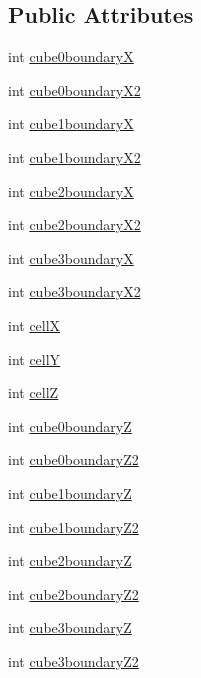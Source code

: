 \subsection*{Public Attributes}
\begin{DoxyCompactItemize}
\item 
int \hyperlink{classl_shape_a010d0a5f7112c92ba28d1ae461af5bf4}{cube0boundary\-X}
\item 
int \hyperlink{classl_shape_a4af09e60d1ee2408c5ff33ada6d6c7ae}{cube0boundary\-X2}
\item 
int \hyperlink{classl_shape_ad55fd69b555360ad332e15c30e4d496a}{cube1boundary\-X}
\item 
int \hyperlink{classl_shape_a89bc6ad05e9a45db52341c5ef745b020}{cube1boundary\-X2}
\item 
int \hyperlink{classl_shape_aebf8ca792e9ee7de8c5b4674f93f3123}{cube2boundary\-X}
\item 
int \hyperlink{classl_shape_ae6dbc4f9550014728716311d769263a2}{cube2boundary\-X2}
\item 
int \hyperlink{classl_shape_a605675f9717c3278a5d75e1b5e8eaf68}{cube3boundary\-X}
\item 
int \hyperlink{classl_shape_a0f7a444fa8cd6e97446cbabab54e2694}{cube3boundary\-X2}
\item 
int \hyperlink{classl_shape_ab48fe215855332a414a9930a6dae359c}{cell\-X}
\item 
int \hyperlink{classl_shape_af4e268d18f4fd440f8b48b0fe87bdf00}{cell\-Y}
\item 
int \hyperlink{classl_shape_aa6625e8e7174937db9a4a10332487026}{cell\-Z}
\item 
int \hyperlink{classl_shape_abdf2181c2378c1025d0d716062355b31}{cube0boundary\-Z}
\item 
int \hyperlink{classl_shape_ab7b42fc5ba4716bca56f7a2c77ce11b8}{cube0boundary\-Z2}
\item 
int \hyperlink{classl_shape_adc6f45919d650e2d0f487a186bfb95b3}{cube1boundary\-Z}
\item 
int \hyperlink{classl_shape_a79e7fe12075824f2f6aeab228bccb6ca}{cube1boundary\-Z2}
\item 
int \hyperlink{classl_shape_af5fc326d5ef1e96d6ce07f8b30613fba}{cube2boundary\-Z}
\item 
int \hyperlink{classl_shape_a0a77638d9024faef9d681d1952676e4a}{cube2boundary\-Z2}
\item 
int \hyperlink{classl_shape_a3c7d3b8972b9c3f1412b68fd5aa1578c}{cube3boundary\-Z}
\item 
int \hyperlink{classl_shape_ad8c92abfc345e4db74163fc6ddccfbab}{cube3boundary\-Z2}

\end{DoxyCompactItemize}
